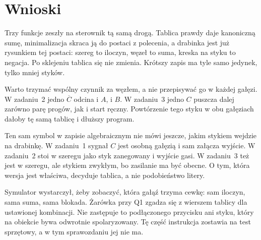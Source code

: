 \newpage
\section{Wnioski}

Trzy funkcje zeszły na sterownik tą samą drogą. Tablica prawdy daje kanoniczną sumę, minimalizacja skraca ją do postaci z polecenia, a drabinka jest już rysunkiem tej postaci: szereg to iloczyn, węzeł to suma, kreska na styku to negacja. Po sklejeniu tablica się nie zmienia. Krótszy zapis ma tyle samo jedynek, tylko mniej styków.

Warto trzymać wspólny czynnik za węzłem, a nie przepisywać go w każdej gałęzi. W zadaniu~2 jedno $\overline{C}$ odcina i $A$, i $B$. W zadaniu~3 jedno $C$ puszcza dalej zarówno parę progów, jak i start ręczny. Powtórzenie tego styku w obu gałęziach dałoby tę samą tablicę i dłuższy program.

Ten sam symbol w zapisie algebraicznym nie mówi jeszcze, jakim stykiem wejdzie na drabinkę. W zadaniu~1 sygnał $C$ jest osobną gałęzią i sam załącza wyjście. W zadaniu~2 stoi w szeregu jako styk zanegowany i wyjście gasi. W zadaniu~3 też jest w szeregu, ale stykiem zwykłym, bo zasilanie ma być obecne. O tym, która wersja jest właściwa, decyduje tablica, a nie podobieństwo litery.

Symulator wystarczył, żeby zobaczyć, która gałąź trzyma cewkę: sam iloczyn, sama suma, sama blokada. Żarówka przy Q1 zgadza się z wierszem tablicy dla ustawionej kombinacji. Nie zastępuje to podłączonego przycisku ani styku, który na obiekcie bywa odwrotnie spolaryzowany. Tę część instrukcja zostawia na test sprzętowy, a w tym sprawozdaniu jej nie ma.
